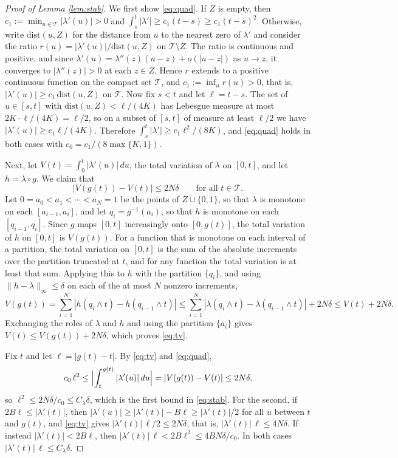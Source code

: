 \documentclass[11pt]{article}
\newcommand{\T}{\mathcal{T}}
\newcommand{\norm}[1]{\|#1\|_\infty}
\begin{document}
\begin{proof}[Proof of Lemma \ref{lem:stab}]
We first show \eqref{eq:quad}. If $Z$ is empty, then $c_1 := \min_{u\in\T}|\lambda'(u)| > 0$ and
$\int_s^t|\lambda'| \ge c_1(t-s) \ge c_1(t-s)^2$. Otherwise, write $\mathrm{dist}(u,Z)$ for the
distance from $u$ to the nearest zero of $\lambda'$ and consider the ratio
$r(u) = |\lambda'(u)|/\mathrm{dist}(u,Z)$ on $\T\setminus Z$. The ratio is continuous and
positive, and since $\lambda'(u) = \lambda''(z)(u-z) + o(|u-z|)$ as $u \to z$, it converges to
$|\lambda''(z)| > 0$ at each $z \in Z$. Hence $r$ extends to a positive continuous function
on the compact set $\T$, and $c_1 := \inf_u r(u) > 0$, that is,
$|\lambda'(u)| \ge c_1\,\mathrm{dist}(u,Z)$ on $\T$. Now fix $s < t$ and let $\ell = t-s$. The
set of $u\in[s,t]$ with $\mathrm{dist}(u,Z) < \ell/(4K)$ has Lebesgue measure at most
$2K\cdot\ell/(4K) = \ell/2$, so on a subset of $[s,t]$ of measure at least $\ell/2$ we have
$|\lambda'(u)| \ge c_1\ell/(4K)$. Therefore $\int_s^t|\lambda'| \ge c_1\ell^2/(8K)$, and
\eqref{eq:quad} holds in both cases with $c_0 = c_1/(8\max\{K,1\})$.

Next, let $V(t) = \int_0^t|\lambda'(u)|\,du$, the total variation of $\lambda$ on $[0,t]$, and
let $h = \lambda\circ g$. We claim that
\begin{equation}
  |V(g(t)) - V(t)| \le 2N\delta \qquad \text{for all } t\in\T.
  \label{eq:tv}
\end{equation}
Let $0 = a_0 < a_1 < \cdots < a_N = 1$ be the points of $Z\cup\{0,1\}$, so that $\lambda$ is
monotone on each $[a_{i-1},a_i]$, and let $q_i = g^{-1}(a_i)$, so that $h$ is monotone on
each $[q_{i-1},q_i]$. Since $g$ maps $[0,t]$ increasingly onto $[0,g(t)]$, the total
variation of $h$ on $[0,t]$ is $V(g(t))$. For a function that is monotone on each interval of
a partition, the total variation on $[0,t]$ is the sum of the absolute increments over the
partition truncated at $t$, and for any function the total variation is at least that sum.
Applying this to $h$ with the partition $\{q_i\}$, and using $\norm{h-\lambda}\le\delta$ on
each of the at most $N$ nonzero increments,
\[
  V(g(t)) = \sum_{i=1}^N |h(q_i\wedge t) - h(q_{i-1}\wedge t)|
  \le \sum_{i=1}^N |\lambda(q_i\wedge t) - \lambda(q_{i-1}\wedge t)| + 2N\delta
  \le V(t) + 2N\delta.
\]
Exchanging the roles of $\lambda$ and $h$ and using the partition $\{a_i\}$ gives
$V(t) \le V(g(t)) + 2N\delta$, which proves \eqref{eq:tv}.

Fix $t$ and let $\ell = |g(t)-t|$. By \eqref{eq:tv} and \eqref{eq:quad},
\[
  c_0\,\ell^2 \le \Bigl|\int_t^{g(t)}|\lambda'(u)|\,du\Bigr| = |V(g(t)) - V(t)| \le 2N\delta,
\]
so $\ell^2 \le 2N\delta/c_0 \le C_\lambda\delta$, which is the first bound in \eqref{eq:stab}.
For the second, if $2B\ell \le |\lambda'(t)|$, then $|\lambda'(u)| \ge |\lambda'(t)| - B\ell
\ge |\lambda'(t)|/2$ for all $u$ between $t$ and $g(t)$, and \eqref{eq:tv} gives
$|\lambda'(t)|\,\ell/2 \le 2N\delta$, that is, $|\lambda'(t)|\,\ell \le 4N\delta$. If instead
$|\lambda'(t)| < 2B\ell$, then $|\lambda'(t)|\,\ell < 2B\ell^2 \le 4BN\delta/c_0$. In both cases
$|\lambda'(t)|\,\ell \le C_\lambda\delta$.
\end{proof}
\end{document}
